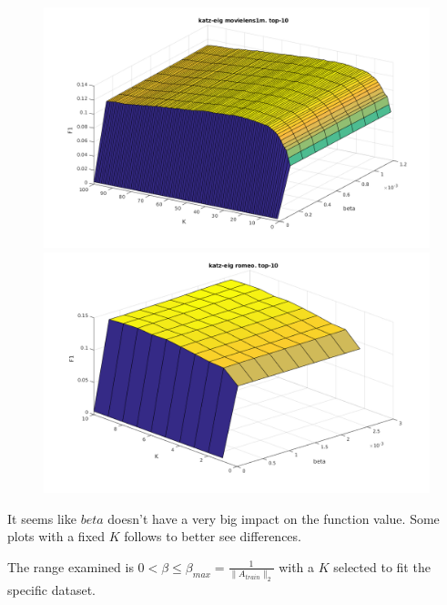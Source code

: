 \begin{figure}[h!]
\centering
\begin{minipage}{.5\textwidth}
    \centering
    \includegraphics[width=\linewidth]{fig/katzeig_beta_k/movielens_katzeig.png}
\end{minipage}%
\begin{minipage}{.5\textwidth}
    \centering
    \includegraphics[width=\linewidth]{fig/katzeig_beta_k/romeo_katzeig.png}
\end{minipage}
\end{figure}




It seems like $beta$ doesn't have a very big impact on the function value. Some plots with a fixed $K$ follows to better see differences.

The range examined is $0 < \beta \leq \beta_{max} = \frac{1}{\|A_{train}\|_2}$ with a $K$ selected to fit the specific dataset.

